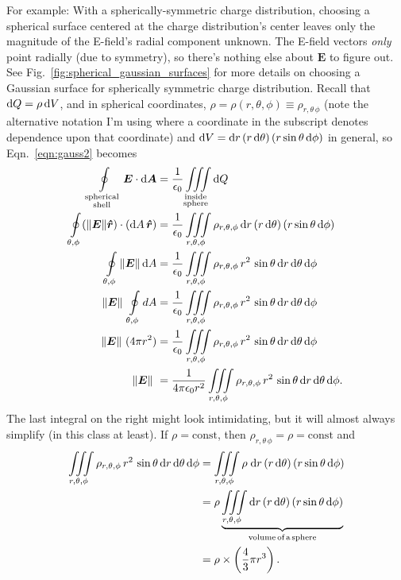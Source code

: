 \documentclass[10pt,letterpaper,twoside]{article}
\begin{document}
For example: With a spherically-symmetric charge distribution, choosing a spherical surface centered at the charge distribution's center leaves only the magnitude of the E-field's radial component unknown.
The E-field vectors \textit{only} point radially (due to symmetry), so there's nothing else about $\bm E$ to figure out.
See Fig.~\ref{fig:spherical_gaussian_surfaces} for more details on choosing a Gaussian surface for spherically symmetric charge distribution.
Recall that $\text d Q = \rho \, \text d V$, and in spherical coordinates, $\rho=\rho(r,\theta,\phi)\equiv\rho_{r,\theta\,\phi}$ (note the alternative notation I'm using where a coordinate in the subscript denotes dependence upon that coordinate) and $\text d V = \text d r  \, (r \, \text d \theta) \, (r \sin\theta\,\text d\phi)$ in general, so Eqn.~\ref{eqn:gauss2} becomes
\begin{align*}
  \oint\limits_{\substack{\mathrm{spherical}\\\mathrm{shell}}} \bm E\cdot \mathrm{d}\bm A &= \frac{1}{\epsilon_0}\iiint\limits_{\substack{\mathrm{inside}\\ \mathrm{sphere}}} \text d Q \\
  \oint\limits_{\theta,\phi} (\|\bm E\|\bm{\hat r}) \cdot (\mathrm{d}A\,\bm{\hat r}) &= \frac{1}{\epsilon_0}\iiint\limits_{r,\theta,\phi} \rho_{r,\theta,\phi} \, \text d r  \, (r \, \text d \theta) \, (r \sin\theta\,\text d\phi)\\
  \oint\limits_{\theta,\phi} \|\bm E\|\,\mathrm{d}A &= \frac{1}{\epsilon_0}\iiint\limits_{r,\theta,\phi} \rho_{r,\theta,\phi} \, r^2 \, \sin\theta \, \text d r  \, \text d \theta \, \text d\phi\\
  \|\bm E\|\ \oint\limits_{\theta,\phi} {d}A &= \frac{1}{\epsilon_0}\iiint\limits_{r,\theta,\phi} \rho_{r,\theta,\phi} \, r^2 \, \sin\theta \, \text d r  \, \text d \theta \, \text d\phi\\
  \|\bm E\|\ (4\pi r^2) &= \frac{1}{\epsilon_0}\iiint\limits_{r,\theta,\phi} \rho_{r,\theta,\phi} \, r^2 \, \sin\theta \, \text d r  \, \text d \theta \, \text d\phi\\
  \|\bm E\|\ &= \frac{1}{4\pi\epsilon_0 r^2}\iiint\limits_{r,\theta,\phi}  \rho_{r,\theta,\phi} \, r^2 \, \sin\theta \, \text d r  \, \text d \theta \, \text d\phi.
\end{align*}
The last integral on the right might look intimidating, but it will almost always simplify (in this class at least).
If $\rho=\text{const}$, then $\rho_{r,\theta\,\phi}=\rho=\text{const}$ and
\begin{align*}
	\iiint\limits_{r,\theta,\phi} \rho_{r,\theta,\phi} \, r^2 \, \sin\theta \, \text d r  \, \text d \theta \, \text d\phi &= \iiint\limits_{r,\theta,\phi} \rho \; \text d r  \, (r \, \text d \theta) \, (r \sin\theta\,\text d\phi) \\
	 &= \rho \underbrace{\iiint\limits_{r,\theta,\phi} \text d r  \, (r \, \text d \theta) \, (r \sin\theta\,\text d\phi)}_\text{volume\,of\,a\,sphere} \\
	 &= \rho \times \left( \frac{4}{3}\pi r^3 \right).
\end{align*}
\end{document}
